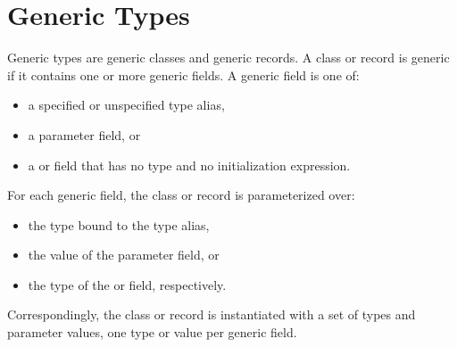 \section{Generic Types}
\label{Generic_Types}

Generic types are generic classes and generic records.
A class or record is generic if it contains one or more
generic fields. A generic field is one of:
\begin{itemize}
\item a specified or unspecified type alias,
\item a parameter field, or
\item a  or  field that has no type and no initialization
expression.
\end{itemize}

For each generic field, the class or record is parameterized over:
\begin{itemize}
\item the type bound to the type alias,
\item the value of the parameter field, or
\item the type of the  or  field, respectively.
\end{itemize}
Correspondingly, the class or record is instantiated with a set
of types and parameter values, one type or value per generic field.

% 
% 

